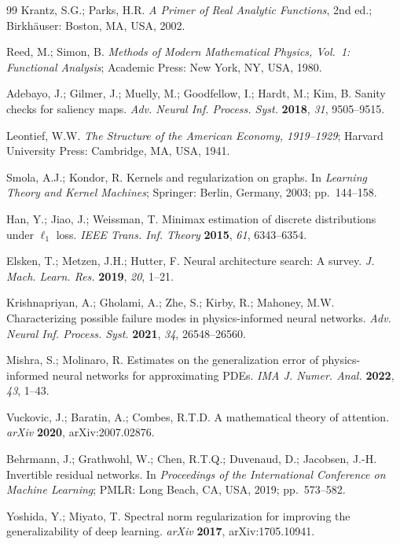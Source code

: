 \documentclass[11pt,a4paper]{article}  %
\theoremstyle{plain}
\theoremstyle{definition}
\theoremstyle{remark}
\begin{document}
\begin{thebibliography}{99}
Krantz, S.G.; Parks, H.R. \textit{A Primer of Real Analytic Functions},
2nd ed.; Birkh\"{a}user: Boston, MA, USA, 2002.

Reed, M.; Simon, B. \textit{Methods of Modern Mathematical Physics,
Vol.~1: Functional Analysis}; Academic Press: New York, NY, USA, 1980.

Adebayo, J.; Gilmer, J.; Muelly, M.; Goodfellow, I.; Hardt, M.;
Kim, B. Sanity checks for saliency maps. \textit{Adv. Neural Inf.
Process. Syst.} \textbf{2018}, \textit{31}, 9505--9515.

Leontief, W.W. \textit{The Structure of the American Economy,
1919--1929}; Harvard University Press: Cambridge, MA, USA, 1941.

Smola, A.J.; Kondor, R. Kernels and regularization on graphs.
In \textit{Learning Theory and Kernel Machines}; Springer:
Berlin, Germany, 2003; pp.~144--158.

Han, Y.; Jiao, J.; Weissman, T. Minimax estimation of discrete
distributions under $\ell_1$ loss. \textit{IEEE Trans. Inf. Theory}
\textbf{2015}, \textit{61}, 6343--6354.

Elsken, T.; Metzen, J.H.; Hutter, F. Neural architecture search:
A survey. \textit{J. Mach. Learn. Res.} \textbf{2019}, \textit{20},
1--21.

Krishnapriyan, A.; Gholami, A.; Zhe, S.; Kirby, R.; Mahoney, M.W.
Characterizing possible failure modes in physics-informed neural
networks. \textit{Adv. Neural Inf. Process. Syst.} \textbf{2021},
\textit{34}, 26548--26560.

Mishra, S.; Molinaro, R. Estimates on the generalization error of
physics-informed neural networks for approximating PDEs.
\textit{IMA J. Numer. Anal.} \textbf{2022}, \textit{43}, 1--43.

Vuckovic, J.; Baratin, A.; Combes, R.T.D. A mathematical theory of
attention. \textit{arXiv} \textbf{2020}, arXiv:2007.02876.

Behrmann, J.; Grathwohl, W.; Chen, R.T.Q.; Duvenaud, D.; Jacobsen, J.-H.
Invertible residual networks. In \textit{Proceedings of the
International Conference on Machine Learning}; PMLR: Long Beach,
CA, USA, 2019; pp.~573--582.

Yoshida, Y.; Miyato, T. Spectral norm regularization for improving
the generalizability of deep learning.
\textit{arXiv} \textbf{2017}, arXiv:1705.10941.


\end{thebibliography}
\end{document}
